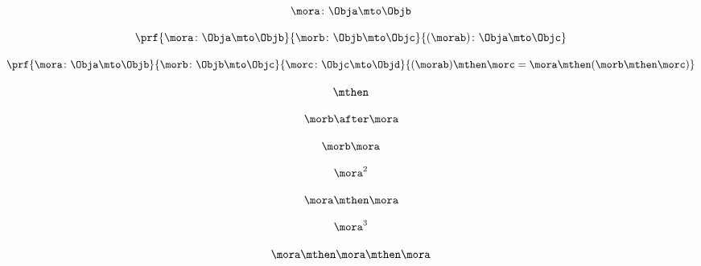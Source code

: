 \begin{forslides}
    \begin{equation}
        \label{eq:semicats-slides-61}
        \mora\colon \Obja \mto \Objb
    \end{equation}

    \begin{equation}
        \label{eq:semicats-slides-62}
        \prf{
            \mora \colon \Obja \mto \Objb
        }{
            \morb\colon \Objb \mto \Objc
        }{
            (\morab )\colon \Obja \mto \Objc
        }
    \end{equation}

    \begin{equation}
        \label{eq:semicats-slides-63}
        \prf{
            \mora \colon \Obja \mto \Objb
        }{
            \morb\colon \Objb \mto \Objc
        }{
            \morc \colon \Objc \mto \Objd
        }{
            (\morab ) \mthen \morc = \mora \mthen ( \morb  \mthen \morc )
        }
    \end{equation}

    \begin{equation}
        \label{eq:semicats-slides-64}
        \mthen
    \end{equation}

    \begin{equation}
        \label{eq:semicats-slides-65}
        \morb\after \mora
    \end{equation}

    \begin{equation}
        \label{eq:semicats-slides-66}
        \morb \mora
    \end{equation}

    \begin{equation}
        \label{eq:semicats-slides-67}
        \mora^2
    \end{equation}

    \begin{equation}
        \label{eq:semicats-slides-68}
        \mora \mthen \mora
    \end{equation}

    \begin{equation}
        \label{eq:semicats-slides-69}
        \mora^3
    \end{equation}

    \begin{equation}
        \label{eq:semicats-slides-70}
        \mora \mthen \mora \mthen \mora
    \end{equation}


\end{forslides}
